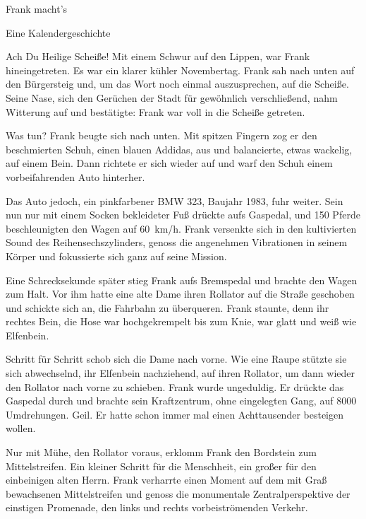 \documentclass [a4paper, 11pt] {article}
\begin{document}
\begin{center}
{\sf\LARGE Frank macht's}
\par\medskip
{\sf Eine Kalendergeschichte}
\end{center}\par

\noindent Ach Du Heilige Scheiße! Mit einem Schwur auf den Lippen, war Frank hineingetreten. Es war ein klarer kühler Novembertag. Frank sah nach unten auf den Bürgersteig und, um das Wort noch einmal auszusprechen, auf die Scheiße. Seine Nase, sich den Gerüchen der Stadt für gewöhnlich verschließend, nahm Witterung auf und bestätigte: Frank war voll in die Scheiße getreten.

Was tun? Frank beugte sich nach unten. Mit spitzen Fingern zog er den beschmierten Schuh, einen blauen Addidas, aus und balancierte, etwas wackelig, auf einem Bein. Dann richtete er sich wieder auf und warf den Schuh einem vorbeifahrenden Auto hinterher. 

Das Auto jedoch, ein pinkfarbener BMW 323, Baujahr 1983, fuhr weiter. Sein nun nur mit einem Socken bekleideter Fuß drückte aufs Gaspedal, und 150 Pferde beschleunigten den Wagen auf \SI{60}{\km/\hour}. Frank versenkte sich in den kultivierten Sound des Reihensechszylinders, genoss die angenehmen Vibrationen in seinem Körper und fokussierte sich ganz auf seine Mission. 

Eine Schrecksekunde später stieg Frank aufs Bremspedal und brachte den Wagen zum Halt. Vor ihm hatte eine alte Dame ihren Rollator auf die Straße geschoben und schickte sich an, die Fahrbahn zu überqueren. Frank staunte, denn ihr rechtes Bein, die Hose war hochgekrempelt bis zum Knie, war glatt und weiß wie Elfenbein.

Schritt für Schritt schob sich die Dame nach vorne. Wie eine Raupe stützte sie sich abwechselnd, ihr Elfenbein nachziehend, auf ihren Rollator, um dann wieder den Rollator nach vorne zu schieben. Frank wurde ungeduldig. Er drückte das Gaspedal durch und brachte sein Kraftzentrum, ohne eingelegten Gang, auf 8000 Umdrehungen. Geil. Er hatte schon immer mal einen Achttausender besteigen wollen.

Nur mit Mühe, den Rollator voraus, erklomm Frank den Bordstein zum Mittelstreifen. Ein kleiner Schritt für die Menschheit, ein großer für den einbeinigen alten Herrn. Frank verharrte einen Moment auf dem mit Graß bewachsenen Mittelstreifen und genoss die monumentale Zentralperspektive der einstigen Promenade, den links und rechts vorbeiströmenden Verkehr.
\end{document}

